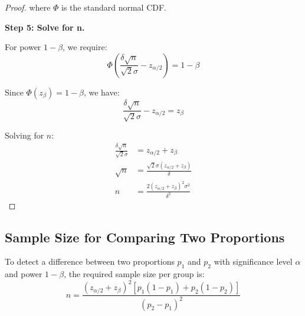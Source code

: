\begin{proof}
where $\Phi$ is the standard normal CDF.

\textbf{Step 5: Solve for n.}

For power $1-\beta$, we require:
\begin{equation}
\Phi\left(\frac{\delta\sqrt{n}}{\sqrt{2}\sigma} - z_{\alpha/2}\right) = 1 - \beta
\end{equation}

Since $\Phi(z_\beta) = 1 - \beta$, we have:
\begin{equation}
\frac{\delta\sqrt{n}}{\sqrt{2}\sigma} - z_{\alpha/2} = z_\beta
\end{equation}

Solving for $n$:
\begin{align}
\frac{\delta\sqrt{n}}{\sqrt{2}\sigma} &= z_{\alpha/2} + z_\beta \\
\sqrt{n} &= \frac{\sqrt{2}\sigma(z_{\alpha/2} + z_\beta)}{\delta} \\
n &= \frac{2(z_{\alpha/2} + z_\beta)^2 \sigma^2}{\delta^2}
\end{align}
\end{proof}

\subsection{Sample Size for Comparing Two Proportions}

\begin{theorem}
To detect a difference between two proportions $p_1$ and $p_2$ with significance level $\alpha$ and power $1-\beta$, the required sample size per group is:
\begin{equation}
n = \frac{(z_{\alpha/2} + z_\beta)^2 [p_1(1-p_1) + p_2(1-p_2)]}{(p_2 - p_1)^2}
\end{equation}
\end{theorem}

